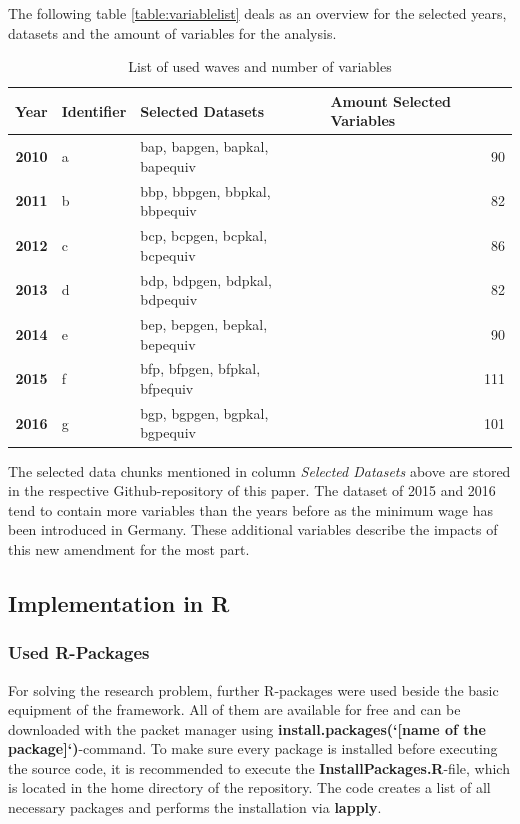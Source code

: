 \documentclass[a4paper]{article}
\begin{document}
The following table \ref{table:variablelist} deals as an overview for the selected years, datasets and the amount of variables for the analysis.

\begin{table}[htbp]
\centering
\caption{List of used waves and number of variables} 
\label{table:variablelist} 
\begin{tabular}{|r|l|l|r|}
\hline
\multicolumn{1}{|l|}{\textbf{Year}} & \textbf{Identifier} & \textbf{Selected Datasets} & \multicolumn{1}{l|}{\textbf{Amount Selected Variables}} \\ \hline
\textbf{2010} & a & bap, bapgen, bapkal, bapequiv & 90 \\ \hline
\textbf{2011} & b & bbp, bbpgen, bbpkal, bbpequiv & 82 \\ \hline
\textbf{2012} & c & bcp, bcpgen, bcpkal, bcpequiv & 86 \\ \hline
\textbf{2013} & d & bdp, bdpgen, bdpkal, bdpequiv & 82 \\ \hline
\textbf{2014} & e & bep, bepgen, bepkal, bepequiv & 90 \\ \hline
\textbf{2015} & f & bfp, bfpgen, bfpkal, bfpequiv & 111 \\ \hline
\textbf{2016} & g & bgp, bgpgen, bgpkal, bgpequiv & 101 \\ \hline
\end{tabular}
\label{}
\end{table}

The selected data chunks mentioned in column \textit{Selected Datasets} above are stored in the respective Github-repository of this paper.
The dataset of 2015 and 2016 tend to contain more variables than the years before as the minimum wage has been introduced in Germany. These additional variables describe the impacts of this new amendment for the most part.

\subsection{Implementation in R}
\subsubsection{Used R-Packages}
\label{rpackages}
For solving the research problem, further R-packages were used beside the basic equipment of the framework. All of them are available for free and can be downloaded with the packet manager using \textbf{install.packages(‘[name of the package]‘)}-command. To make sure every package is installed before executing the source code, it is recommended to execute the \textbf{InstallPackages.R}-file, which is located in the home directory of the repository. The code creates a list of all necessary packages and performs the installation via \textbf{lapply}.
\end{document}
